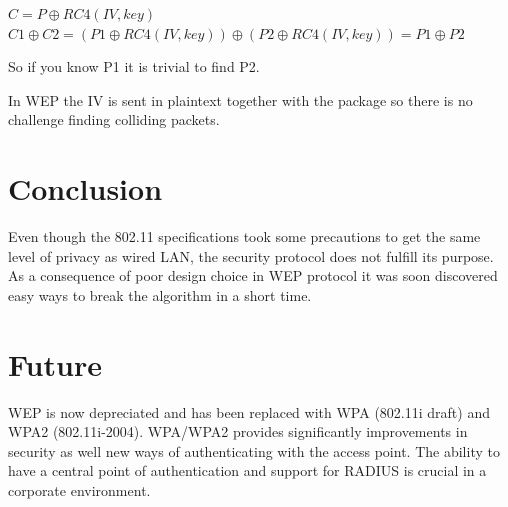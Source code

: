 \documentclass[twocolumn,11pt]{IEEEtran}
\begin{document}
$C = P \oplus RC4(IV,key)$ \\
$C1 \oplus C2 = (P1 \oplus RC4(IV,key) ) \oplus ( P2 \oplus RC4(IV,key)) = P1 \oplus P2 $

So if you know P1 it is trivial to find P2. 

In WEP the IV is sent in plaintext together with the package so there is no challenge finding colliding packets. 

\section {Conclusion}
\label{sec:conclusion}

Even though the 802.11 specifications took some precautions to get the same level of privacy as wired LAN, the security protocol does not fulfill its purpose. As a consequence of poor design choice in WEP protocol it was soon discovered easy ways to break the algorithm in a short time. 


\section {Future}
\label{sec:future}

WEP is now depreciated and has been replaced with WPA (802.11i draft) and WPA2 (802.11i-2004). WPA/WPA2 provides significantly improvements in security as well new ways of authenticating with the access point. The ability to have a central point  of authentication and support for RADIUS is crucial in a corporate environment.






\end{document}
